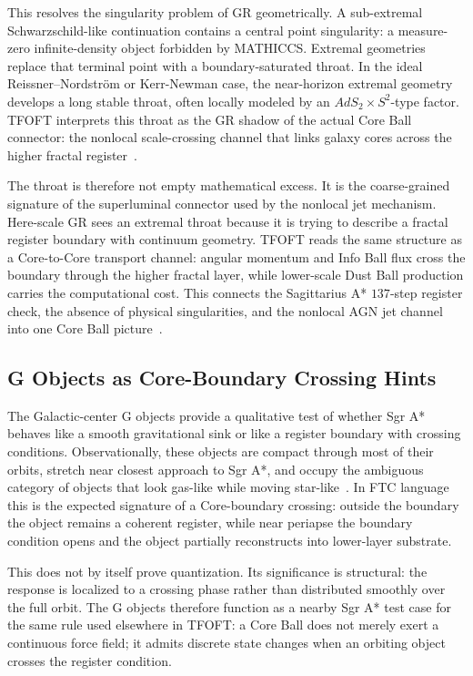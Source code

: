\documentclass[11pt,a4paper]{article}
\begin{document}
    This resolves the singularity problem of GR geometrically. A sub-extremal Schwarzschild-like continuation contains a central point singularity: a measure-zero infinite-density object forbidden by MATHICCS. Extremal geometries replace that terminal point with a boundary-saturated throat. In the ideal Reissner--Nordstr\"om or Kerr-Newman case, the near-horizon extremal geometry develops a long stable throat, often locally modeled by an \(AdS_2\times S^2\)-type factor. TFOFT interprets this throat as the GR shadow of the actual Core Ball connector: the nonlocal scale-crossing channel that links galaxy cores across the higher fractal register~\cite{BardeenHorowitz1999,KunduriLucietti2013,Porfyriadis2018,IliesiuTuriaci2020,HorowitzKolanowskiSantos2022}.

    The throat is therefore not empty mathematical excess. It is the coarse-grained signature of the superluminal connector used by the nonlocal jet mechanism. Here-scale GR sees an extremal throat because it is trying to describe a fractal register boundary with continuum geometry. TFOFT reads the same structure as a Core-to-Core transport channel: angular momentum and Info Ball flux cross the boundary through the higher fractal layer, while lower-scale Dust Ball production carries the computational cost. This connects the Sagittarius A* \(137\)-step register check, the absence of physical singularities, and the nonlocal AGN jet channel into one Core Ball picture~\cite{BardeenHorowitz1999,HorowitzKolanowskiSantos2022}.

  \subsection{G Objects as Core-Boundary Crossing Hints}
  \label{sec:g_objects_crossing}

    The Galactic-center G objects provide a qualitative test of whether Sgr A* behaves like a smooth gravitational sink or like a register boundary with crossing conditions. Observationally, these objects are compact through most of their orbits, stretch near closest approach to Sgr A*, and occupy the ambiguous category of objects that look gas-like while moving star-like~\cite{Ciurlo2020,Witzel2014}. In FTC language this is the expected signature of a Core-boundary crossing: outside the boundary the object remains a coherent register, while near periapse the boundary condition opens and the object partially reconstructs into lower-layer substrate.

    This does not by itself prove quantization. Its significance is structural: the response is localized to a crossing phase rather than distributed smoothly over the full orbit. The G objects therefore function as a nearby Sgr A* test case for the same rule used elsewhere in TFOFT: a Core Ball does not merely exert a continuous force field; it admits discrete state changes when an orbiting object crosses the register condition.
\end{document}
